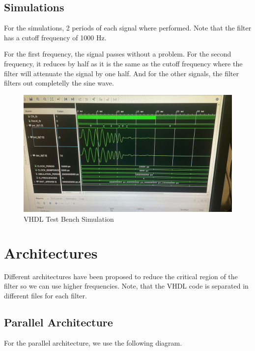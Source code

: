 \documentclass[a4paper, 12pt]{article}
\begin{document}
\subsection{Simulations}
\label{sec:org21b4b60}

For the simulations, 2 periods of each signal where performed. Note that the filter has a cutoff frequency of 1000 Hz.

For the first frequency, the signal passes without a problem. For the second frequency, it reduces by half as it is the same as the cutoff frequency where the filter will attenuate the signal by one half. And for the other signals, the filter filters out completelly the sine wave.

\begin{figure}[htbp]
\centering
\includegraphics[width=.9\linewidth]{./img/simulation.jpg}
\caption{VHDL Test Bench Simulation}
\end{figure}
\section{Architectures}
\label{sec:org31c912b}

Different architectures have been proposed to reduce the critical region of the filter so we can use higher frequencies. Note, that the VHDL code is separated in different files for each filter.
\subsection{Parallel Architecture}
\label{sec:orgdd2cd44}

For the parallel architecture, we use the following diagram.
\end{document}
